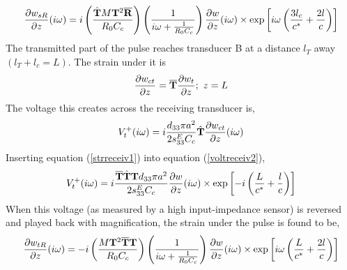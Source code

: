 \documentclass[11pt,letterpaper]{article}%
\begin{document}
%
%
%
%

\begin{equation}
\frac{\partial { w}_{sR}}{\partial z}(i\omega) =
i\left(\frac{\hat{\bf T}M{\bf T}^2\overline{\bf
R}}{R_0C_c}\right)\left(\frac{1}{i\omega +
\frac{1}{R_0C_c}}\right)\frac{\partial {w}}{\partial
z}(i\omega)\times \exp
\left[{i\omega\left(\frac{3l_c}{c^\ast}+\frac{2l}{c}\right)}\right]
\label{strdefect1}
\end{equation}
The transmitted part of the pulse reaches transducer B at a
distance $l_T$ away $(l_T + l_c = L)$.  The strain under it is
\begin{equation}
\frac{\partial { w}_{ct}}{\partial z} = \overline{\bf
T}\frac{\partial {w}_t}{\partial z}; \ z = L \label{strreceiv1}
\end{equation}
%
The voltage this creates across the receiving transducer is,
\begin{equation}
V^+_t(i\omega) =  i\frac{d_{33}\pi a^2}{2s^E_{33}C_c}\hat{\bf
T}\frac{\partial { w}_{ct}}{\partial z}(i\omega)
\label{voltreceiv2}
\end{equation}
%
Inserting equation (\ref{strreceiv1}) into equation
(\ref{voltreceiv2}),
\begin{equation}
V^+_t(i\omega) = i\frac{\overline{\bf T}\hat{\bf T}{\bf
T}d_{33}\pi a^2}{2s^E_{33}C_c}\frac{\partial {w}}{\partial
z}(i\omega)\times{\exp}\left[{-i\left(\frac{L}{c^\ast}+
\frac{l}{c}\right)}\right] \label{voltreceiv3}
\end{equation}
When this voltage (as measured by a high input-impedance sensor) is
reversed and played back with magnification, the strain under the
pulse is found to be,
\begin{equation}
\frac{\partial {w}_{tR}}{\partial z}(i\omega) =
-i\left(\frac{M{\bf T}^2\overline{\bf T}{{\bf
T}}}{R_0C_c}\right)\left(\frac{1}{i\omega +
\frac{1}{R_0C_c}}\right)\frac{\partial {w}}{\partial
z}(i\omega)\times{\exp}\left[{i\omega\left(\frac{L}{c^\ast}+
\frac{2l}{c}\right)}\right] \label{strplaybk1}
\end{equation}
\end{document}
